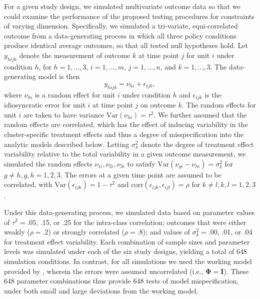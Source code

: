 \documentclass[12pt]{article}
\newcommand{\Var}{\text{Var}}
\newcommand{\bm}{\mathbf}
\newcommand{\bs}{\boldsymbol}
\begin{document}
For a given study design, we simulated multivariate outcome data so that we could examine the performance of the proposed testing procedures for constraints of varying dimension. 
Specifically, we simulated a tri-variate, equi-correlated outcome from a data-generating process in which all three policy conditions produce identical average outcomes, so that all tested null hypotheses hold. 
Let $y_{hijk}$ denote the measurement of outcome $k$ at time point $j$ for unit $i$ under condition $h$, for $h = 1,...,3$, $i = 1,...,m$, $j = 1,...,n$, and $k = 1,...,3$. 
The data-generating model is then 
\begin{equation}
\label{eq:data_generating_model}
y_{hijk} = \nu_{hi} + \epsilon_{ijk},
\end{equation}
where $\nu_{hi}$ is a random effect for unit $i$ under condition $h$ and $\epsilon_{ijk}$ is the idiosyncratic error for unit $i$ at time point $j$ on outcome $k$. 
The random effects for unit $i$ are taken to have variance $\Var\left(\nu_{hi}\right) = \tau^2$. 
We further assumed that the random effects are correlated, which has the effect of inducing variability in the cluster-specific treatment effects and thus a degree of misspecification into the analytic models described below. Letting $\sigma_\delta^2$ denote the degree of treatment effect variability relative to the total variability in a given outcome measurement, we simulated the random effects $\nu_{1i},\nu_{2i},\nu_{3i}$ to satisfy $\text{Var}\left(\nu_{gi} - \nu_{hi}\right) = \sigma_\delta^2$ for $g \neq h, g,h = 1,2,3$. 
The errors at a given time point are assumed to be correlated, with $\Var\left(\epsilon_{ijk}\right) = 1 - \tau^2$ and $\text{corr}\left(\epsilon_{ijk}, \epsilon_{ijl}\right) = \rho$ for $k\neq l, k,l = 1,2,3$. 

Under this data-generating process, we simulated data based on parameter values of $\tau^2 = .05$, .15, or .25 for the intra-class correlation; outcomes that were either weakly ($\rho = .2$) or strongly correlated ($\rho = .8$); and values of $\sigma_\delta^2 = .00$, .01, or .04 for treatment effect variability.
Each combination of sample sizes and parameter levels was simulated under each of the six study designs, yielding a total of 648 simulation conditions.
In contrast, for all simulations we used the working model provided by \citet{Bell2002bias}, wherein the errors were assumed uncorrelated (i.e., $\bs\Phi = \bm{I}$).
These 648 parameter combinations thus provide 648 tests of model mispecification, under both small and large deviations from the working model.
\end{document}
